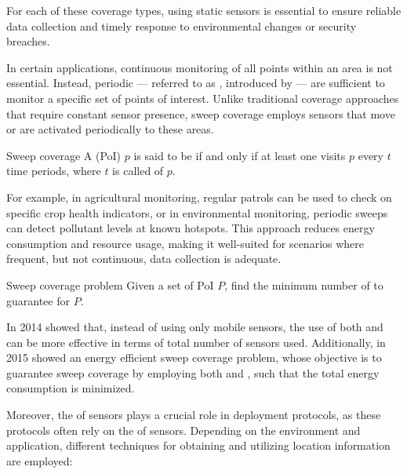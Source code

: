\documentclass[a4paper, 12pt]{report}
\begin{document}
    For each of these coverage types,  using static sensors is essential to ensure reliable data collection and timely response to environmental changes or security breaches.

    In certain applications, continuous monitoring of all points within an area is not essential. Instead, periodic  --- referred to as , introduced by \textcite{cheng2} --- are sufficient to monitor a specific set of points of interest. Unlike traditional coverage approaches that require constant sensor presence, sweep coverage employs sensors that move or are activated periodically to  these areas. 

    \begin{frameddefn}{Sweep coverage}
        A  (PoI) $p$ is said to be  if and only if  at least one  visits $p$ every $t$ time periods, where $t$ is called  of $p$.
    \end{frameddefn}

    For example, in agricultural monitoring, regular patrols can be used to check on specific crop health indicators, or in environmental monitoring, periodic sweeps can detect pollutant levels at known hotspots. This approach reduces energy consumption and resource usage, making it well-suited for scenarios where frequent, but not continuous, data collection is adequate.

    \begin{frameddefn}{Sweep coverage problem}
        Given a set of PoI $P$, find the minimum number of  to guarantee  for $P$.
    \end{frameddefn}

    In 2014 \textcite{gorain14} showed that, instead of using only mobile sensors, the use of both  and  can be more effective in terms of total number of sensors used. Additionally, in 2015 \textcite{gorain15} showed an energy efficient sweep coverage problem, whose objective is to guarantee sweep coverage by employing both  and , such that the total energy consumption is minimized.

    Moreover, the  of sensors plays a crucial role in deployment protocols, as these protocols often rely on the  of sensors. Depending on the environment and application, different techniques for obtaining and utilizing location information are employed:
\end{document}
